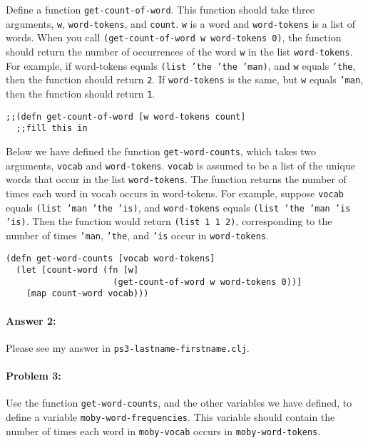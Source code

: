 \documentclass[10pt]{article}
\newcommand{\PSnum}{3}
\begin{document}
Define a function \texttt{get-count-of-word}. This function should
take three arguments, \texttt{w}, \texttt{word-tokens}, and
\texttt{count}. \texttt{w} is a word and \texttt{word-tokens} is a
list of words. When you call \texttt{(get-count-of-word w word-tokens
  0)}, the function should return the number of occurrences of the
word \texttt{w} in the list \texttt{word-tokens}. For example, if
word-tokens equals \texttt{(list 'the 'the 'man)}, and \texttt{w}
equals \texttt{'the}, then the function should return \texttt{2}. If
\texttt{word-tokens} is the same, but \texttt{w} equals \texttt{'man},
then the function should return \texttt{1}.

\begin{lstlisting}
;;(defn get-count-of-word [w word-tokens count]
  ;;fill this in
\end{lstlisting}

Below we have defined the function \texttt{get-word-counts}, which
takes two arguments, \texttt{vocab} and
\texttt{word-tokens}. \texttt{vocab} is assumed to be a list of the
unique words that occur in the list \texttt{word-tokens}. The function
returns the number of times each word in vocab occurs in
word-tokens. For example, suppose \texttt{vocab} equals \texttt{(list
  'man 'the 'is)}, and \texttt{word-tokens} equals \texttt{(list 'the
  'man 'is 'is)}. Then the function would return \texttt{(list 1 1
  2)}, corresponding to the number of times \texttt{'man},
\texttt{'the}, and \texttt{'is} occur in \texttt{word-tokens}.

\begin{lstlisting}
(defn get-word-counts [vocab word-tokens]
  (let [count-word (fn [w] 
                     (get-count-of-word w word-tokens 0))]
    (map count-word vocab)))
\end{lstlisting}

\paragraph{Answer 2:} Please see my answer in
\texttt{ps\PSnum-lastname-firstname.clj}.

\noindent\hrulefill %

\paragraph{Problem 3:}

Use the function \texttt{get-word-counts}, and the other variables we have
defined, to define a variable \texttt{moby-word-frequencies}. This variable
should contain the number of times each word in \texttt{moby-vocab} occurs in
\texttt{moby-word-tokens}.
\end{document}
